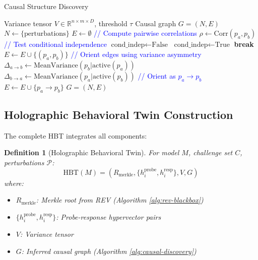 \documentclass[11pt,a4paper]{article}
\newtheorem{definition}{Definition}
\newcommand{\R}{\mathbb{R}}
\begin{document}
\begin{algorithm}
\caption{Causal Structure Discovery}
\label{alg:causal-discovery}
\begin{algorithmic}[1]
\Require Variance tensor $V \in \R^{n \times m \times D}$, threshold $\tau$
\Ensure Causal graph $G = (N, E)$
\State $N \gets \{\text{perturbations}\}$
\State $E \gets \emptyset$
\State \textcolor{blue}{// Compute pairwise correlations}
    \State $\rho \gets \text{Corr}(p_a, p_b)$
    \If{$|\rho| > \tau$}
        \State \textcolor{blue}{// Test conditional independence}
        \State $\text{cond\_indep} \gets \text{False}$
                \State $\text{cond\_indep} \gets \text{True}$
                \State \textbf{break}
            \EndIf
        \EndFor
            \State $E \gets E \cup \{(p_a, p_b)\}$
        \EndIf
    \EndIf
\EndFor
\State \textcolor{blue}{// Orient edges using variance asymmetry}
    \State $\Delta_{a \to b} \gets \text{MeanVariance}(p_b | \text{active}(p_a))$
    \State $\Delta_{b \to a} \gets \text{MeanVariance}(p_a | \text{active}(p_b))$
        \State \textcolor{blue}{// Orient as $p_a \to p_b$}
        \State $E \gets E \cup \{p_a \to p_b\}$
    \EndIf
\EndFor
\State \Return $G = (N, E)$
\end{algorithmic}
\end{algorithm}

\subsection{Holographic Behavioral Twin Construction}

The complete HBT integrates all components:

\begin{definition}[Holographic Behavioral Twin]
For model $M$, challenge set $C$, perturbations $\mathcal{P}$:
\begin{equation}
\text{HBT}(M) = \left(R_{\text{merkle}}, \{h_i^{\text{probe}}, h_i^{\text{resp}}\}, V, G\right)
\end{equation}
where:
\begin{itemize}
\item $R_{\text{merkle}}$: Merkle root from REV (Algorithm \ref{alg:rev-blackbox})
\item $\{h_i^{\text{probe}}, h_i^{\text{resp}}\}$: Probe-response hypervector pairs
\item $V$: Variance tensor
\item $G$: Inferred causal graph (Algorithm \ref{alg:causal-discovery})
\end{itemize}
\end{definition}
\end{document}
